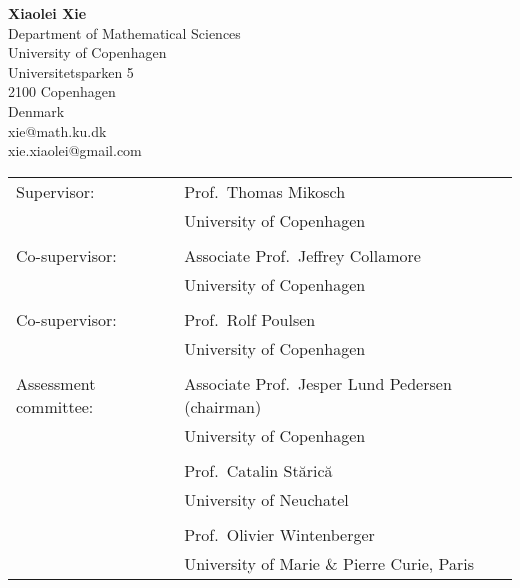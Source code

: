  


\usepackage[numbers,sort&compress]{natbib}
\usepackage{algorithm}
\usepackage{algpseudocode}
\usepackage{appendix}
\usepackage{multirow}
\graphicspath{
        {../papers/FX/}{../papers/Jeffrey1/}
        {../papers/Anja/}
        {../papers/DavisMikoschHeinyXie/}
}







\frontmatter


\newpage
\leavevmode\thispagestyle{empty} 

\hspace*{0.5cm}  {\bf Xiaolei Xie}\\
\hspace*{1.5cm} Department of Mathematical Sciences\\
\hspace*{1.5cm} University of Copenhagen\\
\hspace*{1.5cm} Universitetsparken 5\\
\hspace*{1.5cm} 2100 Copenhagen\\
\hspace*{1.5cm} Denmark\\
\hspace*{1.5cm} xie@math.ku.dk\\
\hspace*{1.5cm} xie.xiaolei@gmail.com

\vspace*{3cm}

\begin{tabular}{ll}
Supervisor: & Prof.~Thomas Mikosch\\
& University of Copenhagen\\
& \\
Co-supervisor: & Associate Prof.~Jeffrey Collamore\\
& University of Copenhagen\\
& \\
Co-supervisor: & Prof.~Rolf Poulsen\\
& University of Copenhagen\\
& \\
Assessment committee:  & Associate Prof.~Jesper Lund Pedersen (chairman)\\
& University of Copenhagen\\
& \\

&  Prof.~Catalin St{\u{a}}ric{\u{a}}\\
& University of Neuchatel\\
& \\

& Prof.~Olivier Wintenberger\\
& University of Marie \& Pierre Curie, Paris
\end{tabular}


